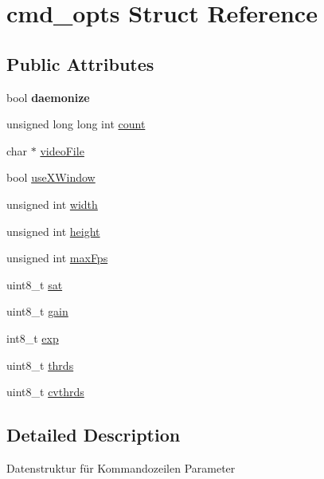 \hypertarget{structcmd__opts}{\section{cmd\+\_\+opts Struct Reference}
\label{structcmd__opts}
}
\subsection*{Public Attributes}
\begin{DoxyCompactItemize}
\item 
\hypertarget{structcmd__opts_a0e94dcdbf5c755d97477c346ece96a2e}{bool {\bfseries daemonize}}\label{structcmd__opts_a0e94dcdbf5c755d97477c346ece96a2e}

\item 
unsigned long long int \hyperlink{structcmd__opts_a582f29b5e8c3328779e88bcb22ff3c2e}{count}
\item 
char $\ast$ \hyperlink{structcmd__opts_acee5a1c6793898bbda38d6d7fb5de431}{video\+File}
\item 
bool \hyperlink{structcmd__opts_aee44e8161de659e8fff50e09100f9ada}{use\+X\+Window}
\item 
unsigned int \hyperlink{structcmd__opts_a0f13b6290e7e33c22a258c11ed23f72f}{width}
\item 
unsigned int \hyperlink{structcmd__opts_a0ab9c9cf886559f8cf19dd2f7be072fb}{height}
\item 
unsigned int \hyperlink{structcmd__opts_a2b42f4e7bd954f5ac87c82e9d19a9b84}{max\+Fps}
\item 
uint8\+\_\+t \hyperlink{structcmd__opts_aa83f2910f6a1803ee8c9f9e3581db314}{sat}
\item 
uint8\+\_\+t \hyperlink{structcmd__opts_a55323cae5dfbafe672e6581da99985b9}{gain}
\item 
int8\+\_\+t \hyperlink{structcmd__opts_aa6ef1ebf0fbaa8bd7016a8ef1a2c5ef4}{exp}
\item 
uint8\+\_\+t \hyperlink{structcmd__opts_a7518cdbdbc6ed1b8cc404aa675f383a6}{thrds}
\item 
uint8\+\_\+t \hyperlink{structcmd__opts_a6d2fcb749257ff950fabdb000999d7f9}{cvthrds}
\end{DoxyCompactItemize}


\subsection{Detailed Description}
Datenstruktur für Kommandozeilen Parameter 

